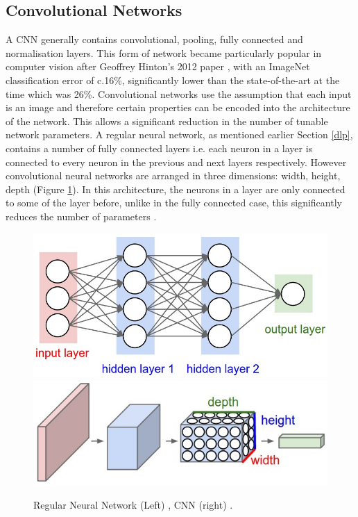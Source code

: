 \documentclass[11pt,twoside]{report}
\begin{document}
\subsection{Convolutional Networks} \label{Cnn_section}
A CNN generally contains convolutional, pooling, fully connected and normalisation layers. This form of network became particularly popular in computer vision after Geoffrey Hinton's 2012 paper \cite{GH_CNN}, with an ImageNet classification error of c.16\%, significantly lower than the state-of-the-art at the time which was 26\%. Convolutional networks use the assumption that each input is an image and therefore certain properties can be encoded into the architecture of the network. This allows a significant reduction in the number of tunable network parameters.
\newline \newline
A regular neural network, as mentioned earlier Section \ref{dlp}, contains a number of fully connected layers i.e. each neuron in a layer is connected to every neuron in the previous and next layers respectively. However convolutional neural networks are arranged in three dimensions: width, height, depth (Figure \ref{CNNvsNN}). In this architecture, the neurons in a layer are only connected to some of the layer before, unlike in the fully connected case, this significantly reduces the number of parameters \cite{StanfordCS231_1}.

\noindent \begin{figure}[h!]
	\includegraphics[width = 0.5\hsize]{./figures/neural_net2.jpeg}
	\includegraphics[width = 0.5\hsize]{./figures/cnn.jpeg}
	\caption{Regular Neural Network (Left) \cite{StanfordCS231_1} , CNN (right) \cite{StanfordCS231_1}.}
	\label{CNNvsNN}
\end{figure}
\end{document}
